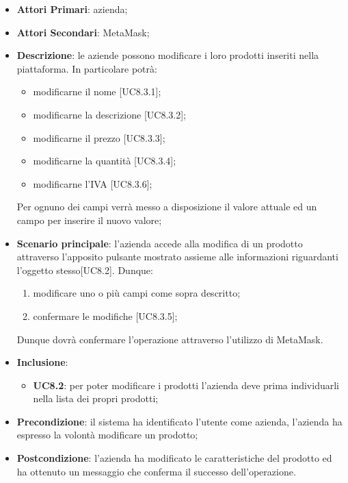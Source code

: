 \begin{itemize}
	\item \textbf{Attori Primari}: azienda;
	\item \textbf{Attori Secondari}: MetaMask\glo;
	\item \textbf{Descrizione}: le aziende possono modificare i loro prodotti inseriti nella piattaforma. In particolare potrà:
	 \begin{itemize}
		\item modificarne il nome [UC8.3.1];
		\item modificarne la descrizione [UC8.3.2];
		\item modificarne il prezzo [UC8.3.3];
		\item modificarne la quantità [UC8.3.4];
		\item modificarne l'IVA [UC8.3.6];
	\end{itemize}
	Per ognuno dei campi verrà messo a disposizione il valore attuale ed un campo per inserire il nuovo valore;

	\item \textbf{Scenario principale}: l'azienda accede alla modifica di un prodotto attraverso l'apposito pulsante mostrato assieme alle informazioni riguardanti l'oggetto stesso[UC8.2]. Dunque: 
	\begin{enumerate}[label=\alph*.]
		\item modificare uno o più campi come sopra descritto;
		\item confermare le modifiche [UC8.3.5];
	\end{enumerate}
	Dunque dovrà confermare l'operazione attraverso l'utilizzo di MetaMask\glo.
	\item \textbf{Inclusione}:
	\begin{itemize}
		\item \textbf{UC8.2}: per poter modificare i prodotti l'azienda deve prima individuarli nella lista dei propri prodotti;
	\end{itemize}
	\item \textbf{Precondizione}: il sistema ha identificato l'utente come azienda, l'azienda ha espresso la volontà modificare un prodotto;
	\item \textbf{Postcondizione}: l'azienda ha modificato le caratteristiche del prodotto ed ha ottenuto un messaggio che conferma il successo dell'operazione.	
\end{itemize}


